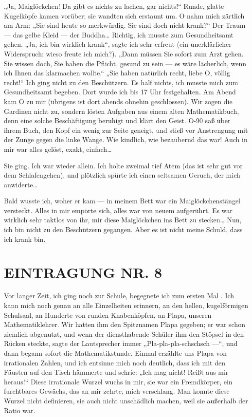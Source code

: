 „Ja, Maiglöckchen! Da gibt es nichts zu lachen, gar nichts!“ Runde,
glatte Kugelköpfe kamen vorüber; sie wandten sich erstaunt um. O
nahm mich zärtlich am Arm: „Sie sind heute so merkwürdig. Sie sind
doch nicht krank?“ Der Traum — das gelbe Kleid — der Buddha\ldots{}
Richtig, ich musste zum Gesundheitsamt gehen. „Ja, ich bin wirklich
krank“, sagte ich sehr erfreut (ein unerklärlicher Widerspruch:
wieso freute ich mich?). „Dann müssen Sie sofort zum Arzt gehen.
Sie wissen doch, Sie haben die Pflicht, gesund zu sein — es wäre
lächerlich, wenn ich Ihnen das klarmachen wollte.“ „Sie haben
natürlich recht, liebe O, völlig recht!“ Ich ging nicht zu den
Beschützern. Es half nichts, ich musste mich zum Gesundheitsamt
begeben. Dort wurde ich bis 17 Uhr festgehalten. Am Abend kam O zu
mir (übrigens ist dort abends ohnehin geschlossen). Wir zogen die
Gardinen nicht zu, sondern lösten Aufgaben aus einem alten
Mathematikbuch, denn eine solche Beschäftigung beruhigt und klärt
den Geist. O-90 saß über ihrem Buch, den Kopf ein wenig zur Seite
geneigt, und stieß vor Anstrengung mit der Zunge gegen die linke
Wange. Wie kindlich, wie bezaubernd das war! Auch in mir war alles
gelöst, exakt, einfach\ldots{}

Sie ging. Ich war wieder allein. Ich holte zweimal tief Atem (das
ist sehr gut vor dem Schlafengehen), und plötzlich spürte ich einen
seltsamen Geruch, der mich anwiderte\ldots{}

Bald wusste ich, woher er kam — in meinem Bett war ein
Maiglöckchenstängel versteckt. Alles in mir empörte sich, alles war
von neuem aufgerührt. Es war wirklich sehr taktlos von ihr, mir
diese Maiglöckchen ins Bett zu stecken\ldots{} Nun, ich bin nicht zu den
Beschützern gegangen. Aber es ist nicht meine Schuld, dass ich
krank bin.

\section{EINTRAGUNG NR. 8}

Vor langer Zeit, ich ging noch zur Schule, begegnete ich zum ersten
Mal \wurzel{}. Ich kann mich noch genau an alle Einzelheiten erinnern, an
den hellen, kugelförmigen Schulsaal, an Hunderte von runden
Knabenköpfen, an Plapa, unseren Mathematiklehrer. Wir hatten ihm
den Spitznamen Plapa gegeben; er war schon ziemlich abgenutzt, und
wenn der diensthabende Schüler ihm den Stöpsel in den Rücken
steckte, sagte der Lautsprecher immer „Pla-pla-pla-schschsch —“,
und dann begann sofort die Mathematikstunde. Einmal erzählte uns
Plapa von irrationalen Zahlen, und ich entsinne mich noch deutlich,
dass ich mit den Fäusten auf den Tisch hämmerte und schrie: „Ich
mag \wurzel{} nicht! Reißt \wurzel{} aus mir heraus!“ Diese irrationale Wurzel
wuchs in mir, sie war ein Fremdkörper, ein furchtbares Gewächs, das
an mir zehrte, mich verschlang. Man konnte diese Wurzel nicht
definieren, sie auch nicht unschädlich machen, weil sie außerhalb
der Ratio war.

